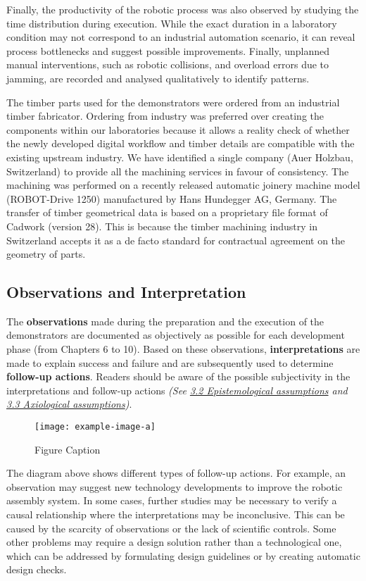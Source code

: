 Finally, the productivity of the robotic process was also observed by studying the time distribution during execution. While the exact duration in a laboratory condition may not correspond to an industrial automation scenario, it can reveal process bottlenecks and suggest possible improvements. Finally, unplanned manual interventions, such as robotic collisions, and overload errors due to jamming, are recorded and analysed qualitatively to identify patterns.

The timber parts used for the demonstrators were ordered from an industrial timber fabricator. Ordering from industry was preferred over creating the components within our laboratories because it allows a reality check of whether the newly developed digital workflow and timber details are compatible with the existing upstream industry. We have identified a single company (Auer Holzbau, Switzerland) to provide all the machining services in favour of consistency. The machining was performed on a recently released automatic joinery machine model (ROBOT-Drive 1250) manufactured by Hans Hundegger AG, Germany. The transfer of timber geometrical data is based on a proprietary file format of Cadwork (version 28). This is because the timber machining industry in Switzerland accepts it as a de facto standard for contractual agreement on the geometry of parts.

\subsection{Observations and Interpretation}
\label{subsection:methodology_observations_and_interpretation}

The \textbf{observations }made during the preparation and the execution of the demonstrators are documented as objectively as possible for each development phase (from Chapters 6 to 10). Based on these observations, \textbf{interpretations }are made to explain success and failure and are subsequently used to determine \textbf{follow-up actions}. Readers should be aware of the possible subjectivity in the interpretations and follow-up actions \textit{(See \ul{3.2 Epistemological assumptions} and \ul{3.3 Axiological assumptions})}. 

\begin{figure}
    \centering
    \texttt{[image: example-image-a]}
    \caption{Figure Caption}
\end{figure}

The diagram above shows different types of follow-up actions. For example, an observation may suggest new technology developments to improve the robotic assembly system. In some cases, further studies may be necessary to verify a causal relationship where the interpretations may be inconclusive. This can be caused by the scarcity of observations or the lack of scientific controls. Some other problems may require a design solution rather than a technological one, which can be addressed by formulating design guidelines or by creating automatic design checks. 


